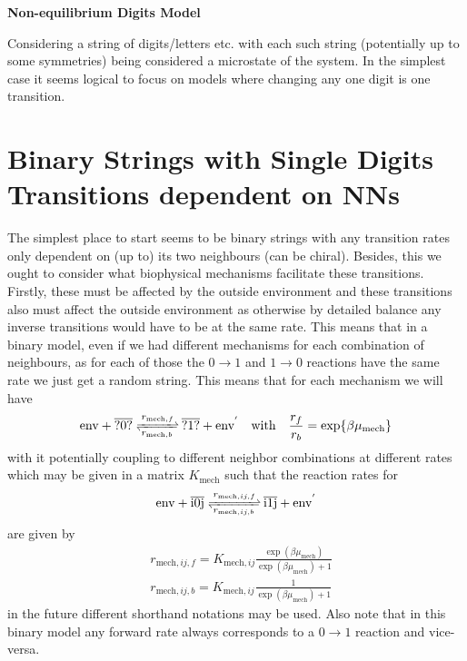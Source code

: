 \documentclass[11pt]{article}
\begin{document}
\begin{center}
	\LARGE
	\textbf{Non-equilibrium Digits Model}
	\vspace{1em}
\end{center}
Considering a string of digits/letters etc. with each such string (potentially up to some symmetries) being considered a microstate of the system.
In the simplest case it seems logical to focus on models where changing any one digit is one transition.

\section{Binary Strings with Single Digits Transitions dependent on NNs}
The simplest place to start seems to be binary strings with any transition rates only dependent on (up to) its two neighbours (can be chiral).
Besides, this we ought to consider what biophysical mechanisms facilitate these transitions.
Firstly, these must be affected by the outside environment and these transitions also must affect the outside environment as otherwise by detailed balance any inverse transitions would have to be at the same rate.
This means that in a binary model, even if we had different mechanisms for each combination of neighbours, as for each of those the $0\rightarrow1$ and $1\rightarrow0$ reactions have the same rate we just get a random string.
This means that for each mechanism we will have
\begin{equation}
	\ce{\text{env} + \overline{?0?} <=>[$r_{\text{mech},f}$][$r_{\text{mech},b}$] \overline{?1?} + \text{env}^'} \qq{with} \frac{r_f}{r_b} = \exp{\beta \mu_\text{mech}}
\end{equation}
with it potentially coupling to different neighbor combinations at different rates which may be given in a matrix $K_\text{mech}$ such that the reaction rates for
\begin{equation}
	\ce{\text{env} + \overline{i0j} <=>[$r_{\text{mech},ij,f}$][$r_{\text{mech},ij,b}$] \overline{i1j} + \text{env}^'}
\end{equation}
are given by
\begin{align}
	 & r_{\text{mech},ij,f} = K_{\text{mech},ij} \frac{\exp(\beta\mu_\text{mech})}{\exp(\beta\mu_\text{mech})+1} \label{eq:rfmech} \\
	 & r_{\text{mech},ij,b} = K_{\text{mech},ij} \frac{1}{\exp(\beta\mu_\text{mech})+1} \label{eq:rbmech}
\end{align}
in the future different shorthand notations may be used.
Also note that in this binary model any forward rate always corresponds to a $0\rightarrow1$ reaction and vice-versa.
\end{document}
